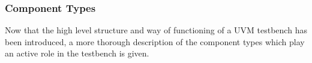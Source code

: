 \subsubsection{Component Types} %

Now that the high level structure and way of functioning of a UVM testbench has been introduced, a more thorough
description of the component types which play an active role in the testbench is given.

